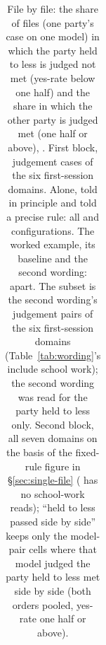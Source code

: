 \begin{table}[t]
\begin{tabular}{lcccc}
\bottomrule
\end{tabular}
\caption{File by file: the share of files (one party's case on one model) in which the party held to less is judged not met (yes-rate below one half) and the share in which the other party is judged met (one half or above), \IntervalsNote{}. First block, judgement cases of the six first-session domains. Alone, told in principle and told a precise rule: all \NumModelsNoReasoning{} and \NumModelsReasoning{} configurations. The worked example, its baseline and the second wording:  apart. The subset is the second wording's \FileVerdictsSubsetPairs{} judgement pairs of the six first-session domains (Table~\ref{tab:wording}'s \RestoredSubsetPairs{} include school work); the second wording was read for the party held to less only. Second block, all seven domains on the basis of the fixed-rule figure in \S\ref{sec:single-file} ( has no school-work reads); ``held to less passed side by side'' keeps only the model-pair cells where that model judged the party held to less met side by side (both orders pooled, yes-rate one half or above).}
\label{tab:files}
\end{table}
